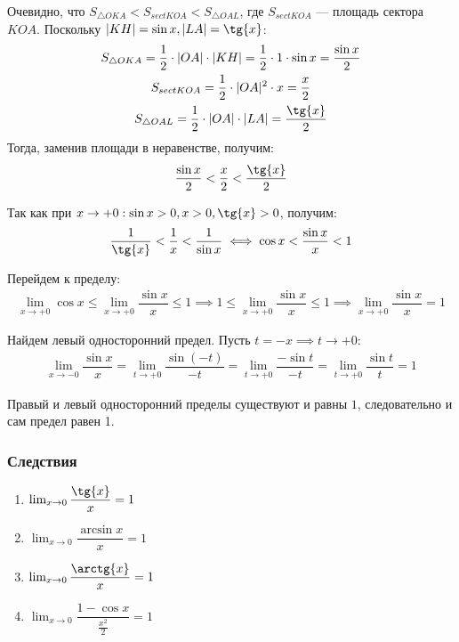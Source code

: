 \documentclass[a4paper,12pt]{extbook}
\theoremstyle{numbered}
\theoremstyle{named}
\theoremstyle{named}
\theoremstyle{named}
\begin{document}
Очевидно, что \(S_{\triangle OKA} < S_{sect KOA} < S_{\triangle OAL}\), где \(S_{sect KOA}\) — площадь сектора  \(KOA\). Поскольку \(|KH| = \sin{x}, |LA| = \tg{x}\):
\begin{gather*}
    S_{\triangle OKA} = \frac{1}{2} \cdot |OA| \cdot |KH| = \frac{1}{2} \cdot 1 \cdot \sin{x} = \frac{\sin{x}}{2} \\
    S_{sect KOA} = \frac{1}{2} \cdot |OA|^2 \cdot x = \frac{x}{2}                                                 \\
    S_{\triangle OAL} = \frac{1}{2} \cdot |OA| \cdot |LA| = \frac{\tg{x}}{2}
\end{gather*}
Тогда, заменив площади в неравенстве, получим:
\begin{gather*}
    \dfrac{\sin{x}}{2} < \dfrac{x}{2} < \dfrac{\tg{x}}{2}
\end{gather*}

Так как при \(x \to +0: \sin{x} > 0, x > 0, \tg{x} > 0\), получим:
\begin{gather*}
    \dfrac{1}{\tg{x}} < \dfrac{1}{x} < \dfrac{1}{\sin{x}} \iff \cos{x} < \dfrac{\sin{x}}{x} < 1
\end{gather*}

Перейдем к пределу:
\begin{gather*}
    \lim_{x \to +0}{\cos{x}} \leq \lim_{x \to +0}{\dfrac{\sin{x}}{x}} \leq 1 \implies 1 \leq \lim_{x \to +0}{\dfrac{\sin{x}}{x}} \leq 1 \implies \lim_{x \to +0}{\dfrac{\sin{x}}{x}} = 1
\end{gather*}

Найдем левый односторонний предел. Пусть \(t = -x \implies t \to +0\):
\begin{gather*}
    \lim_{x \to -0}{\dfrac{\sin{x}}{x}} = \lim_{t \to +0}{\dfrac{\sin{(-t)}}{-t}} = \lim_{t \to +0}{\dfrac{-\sin{t}}{-t}} = \lim_{t \to +0}{\dfrac{\sin{t}}{t}} = 1
\end{gather*}

Правый и левый односторонний пределы существуют и равны \(1\), следовательно и сам предел равен 1.

\subsubsection*{Следствия}
\begin{enumerate}
    \item {\(\lim_{x \to 0}{\dfrac{\tg{x}}{x}} = 1\)}
    \item {\(\lim_{x \to 0}{\dfrac{\arcsin{x}}{x}} = 1\)}
    \item {\(\lim_{x \to 0}{\dfrac{\arctg{x}}{x}} = 1\)}
    \item {\(\lim_{x \to 0}{\dfrac{1 - \cos{x}}{\frac{x^2}{2}}} = 1\)}
\end{enumerate}
\end{document}
